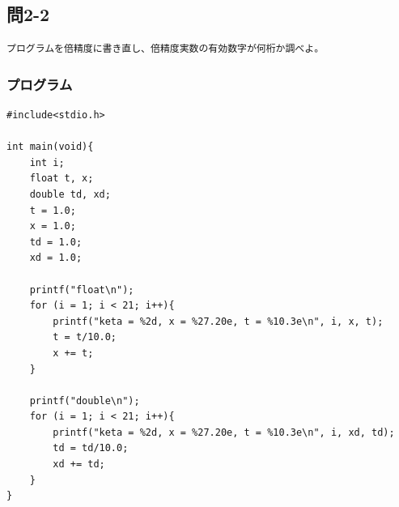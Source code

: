 \documentclass{jarticle}
\begin{document}
\subsection{問2-2\\}
\begin{verbatim}
プログラムを倍精度に書き直し、倍精度実数の有効数字が何桁か調べよ。
\end{verbatim}
\subsubsection{プログラム\\}
\begin{breakbox}
\begin{verbatim}
#include<stdio.h>

int main(void){
    int i;
    float t, x;
    double td, xd;
    t = 1.0;
    x = 1.0;
    td = 1.0;
    xd = 1.0;

    printf("float\n");
    for (i = 1; i < 21; i++){
        printf("keta = %2d, x = %27.20e, t = %10.3e\n", i, x, t);
        t = t/10.0;
        x += t;
    }

    printf("double\n");
    for (i = 1; i < 21; i++){
        printf("keta = %2d, x = %27.20e, t = %10.3e\n", i, xd, td);
        td = td/10.0;
        xd += td;
    }
}
\end{verbatim}
\end{breakbox}
\end{document}
